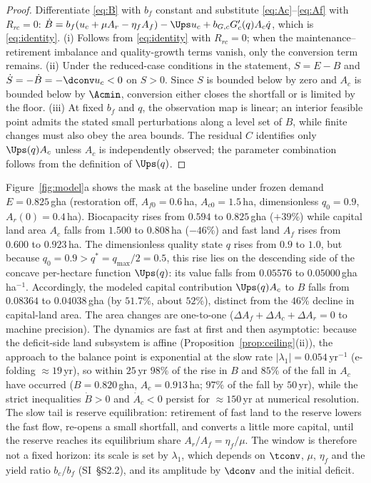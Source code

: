\begin{proof}
Differentiate \eqref{eq:B} with $b_f$ constant and substitute \eqref{eq:Ac}--\eqref{eq:Af} with $R_{rc}=0$: $\dot B=b_f(u_c+\mu A_r-\eta_fA_f)-\Ups u_c+b_{G,c}G_c'(q)A_c\dot q$, which is \eqref{eq:identity}. (i) Follows from \eqref{eq:identity} with $R_{rc}=0$; when the maintenance--retirement imbalance and quality-growth terms vanish, only the conversion term remains. (ii) Under the reduced-case conditions in the statement, $S=E-B$ and $\dot S=-\dot B=-\dconv u_c<0$ on $S>0$. Since $S$ is bounded below by zero and $A_c$ is bounded below by $\Acmin$, conversion either closes the shortfall or is limited by the floor. (iii) At fixed $b_f$ and $q$, the observation map is linear; an interior feasible point admits the stated small perturbations along a level set of $B$, while finite changes must also obey the area bounds. The residual $C$ identifies only $\Ups(q)A_c$ unless $A_c$ is independently observed; the parameter combination follows from the definition of $\Ups(q)$.
\end{proof}

Figure~\ref{fig:model}a shows the mask at the baseline under frozen demand $E=0.825$\,gha (restoration off, $A_{f0}=0.6$\,ha, $A_{c0}=1.5$\,ha, dimensionless $q_0=0.9$, $A_r(0)=0.4$\,ha). Biocapacity rises from $0.594$ to $0.825$\,gha ($+39\%$) while capital land area $A_c$ falls from $1.500$ to $0.808$\,ha ($-46\%$) and fast land $A_f$ rises from $0.600$ to $0.923$\,ha. The dimensionless quality state $q$ rises from $0.9$ to $1.0$, but because $q_0=0.9>q^*=q_{\max}/2=0.5$, this rise lies on the descending side of the concave per-hectare function $\Ups(q)$: its value falls from $0.05576$ to $0.05000$\,gha\,ha$^{-1}$. Accordingly, the modeled capital contribution $\Ups(q)A_c$ to $B$ falls from $0.08364$ to $0.04038$\,gha (by $51.7\%$, about $52\%$), distinct from the $46\%$ decline in capital-land area. The area changes are one-to-one ($\Delta A_f+\Delta A_c+\Delta A_r=0$ to machine precision). The dynamics are fast at first and then asymptotic: because the deficit-side land subsystem is affine (Proposition~\ref{prop:ceiling}(ii)), the approach to the balance point is exponential at the slow rate $|\lambda_1|=0.054\,\mathrm{yr}^{-1}$ (e-folding $\approx19$\,yr), so within $25$\,yr $98\%$ of the rise in $B$ and $85\%$ of the fall in $A_c$ have occurred ($B=0.820$\,gha, $A_c=0.913$\,ha; $97\%$ of the fall by $50$\,yr), while the strict inequalities $\dot B>0$ and $\dot A_c<0$ persist for $\approx150$\,yr at numerical resolution. The slow tail is reserve equilibration: retirement of fast land to the reserve lowers the fast flow, re-opens a small shortfall, and converts a little more capital, until the reserve reaches its equilibrium share $A_r/A_f=\eta_f/\mu$. The window is therefore not a fixed horizon: its scale is set by $\lambda_1$, which depends on $\tconv$, $\mu$, $\eta_f$ and the yield ratio $b_c/b_f$ (SI~\S S2.2), and its amplitude by $\dconv$ and the initial deficit.


